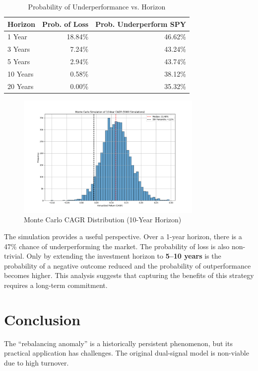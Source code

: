 \documentclass{article}
\begin{document}
\begin{table}[htbp]
\centering
\caption{Probability of Underperformance vs. Horizon}
\begin{tabular}{lrr}
\toprule
\textbf{Horizon} & \textbf{Prob. of Loss} & \textbf{Prob. Underperform SPY} \\
\midrule
1 Year  & 18.84\%        & 46.62\%                 \\
3 Years & 7.24\%         & 43.24\%                 \\
5 Years & 2.94\%         & 43.74\%                 \\
10 Years & 0.58\%         & 38.12\%                 \\
20 Years & 0.00\%         & 35.32\%                 \\
\bottomrule
\end{tabular}
\end{table}

\begin{figure}[htbp]
\centering
\includegraphics[width=0.8\textwidth]{plots/plot_monte_carlo.png}
\caption{Monte Carlo CAGR Distribution (10-Year Horizon)}
\end{figure}

The simulation provides a useful perspective. Over a 1-year horizon, there is a 47\% chance of underperforming the market. The probability of loss is also non-trivial. Only by extending the investment horizon to \textbf{5--10 years} is the probability of a negative outcome reduced and the probability of outperformance becomes higher. This analysis suggests that capturing the benefits of this strategy requires a long-term commitment.

\vspace{1em}
\hrulefill

\section{Conclusion}
The ``rebalancing anomaly'' is a historically persistent phenomenon, but its practical application has challenges. The original dual-signal model is non-viable due to high turnover.
\end{document}
